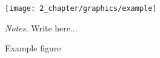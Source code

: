 \begin{figure}[htbp]
\centering
\texttt{[image: 2\_chapter/graphics/example]}
\caption{\label{fig:chapter1-example}Example figure}
\begin{flushleft}
\emph{Notes.} Write here...
\end{flushleft}
\end{figure}
